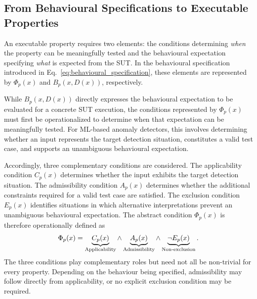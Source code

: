 \documentclass[preprint,12pt]{elsarticle}
\begin{document}
\subsection{From Behavioural Specifications to Executable Properties}
\label{sec:executable_properties}

An executable property requires two elements: the conditions determining
\emph{when} the property can be meaningfully tested and the behavioural
expectation specifying \emph{what} is expected from the SUT.
In the behavioural specification introduced in
Eq.~\ref{eq:behavioural_specification}, these elements are represented by
\(\Phi_p(x)\) and \(B_p(x,D(x))\), respectively.

While \(B_p(x,D(x))\) directly expresses the behavioural expectation to be
evaluated for a concrete SUT execution, the conditions represented by
\(\Phi_p(x)\) must first be operationalized to determine when that expectation
can be meaningfully tested. For ML-based anomaly detectors, this involves determining whether an input
represents the target detection situation, constitutes a valid test case, and
supports an unambiguous behavioural expectation.

Accordingly, three complementary conditions are considered. The applicability
condition \(C_p(x)\) determines whether the input exhibits the target detection
situation. The admissibility condition \(A_p(x)\) determines whether the
additional constraints required for a valid test case are satisfied. The
exclusion condition \(E_p(x)\) identifies situations in which alternative
interpretations prevent an unambiguous behavioural expectation. The abstract
condition \(\Phi_p(x)\) is therefore operationally defined as
\begin{equation}
    \Phi_p(x)
    =
    \underbrace{C_p(x)}_{\text{\scriptsize Applicability}}
    \land
    \underbrace{A_p(x)}_{\text{\scriptsize Admissibility}}
    \land
    \underbrace{\neg E_p(x)}_{\text{\scriptsize Non-exclusion}}.
    \label{eq:operational_conditions}
\end{equation}
The three conditions play complementary roles but need not all be non-trivial
for every property. Depending on the behaviour being specified, admissibility
may follow directly from applicability, or no explicit exclusion condition
may be required.
\end{document}
